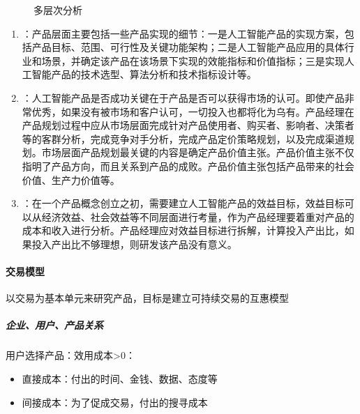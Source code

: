 \documentclass[letterpaper,10pt,english]{sphinxmanual}
\begin{document}
\begin{figure}[H]
\centering
\capstart

\noindent{}
\caption{多层次分析}\label{\detokenize{chapter_idea/business:id31}}\end{figure}
\begin{enumerate}
%
\item {} 
：产品层面主要包括一些产品实现的细节：一是人工智能产品的实现方案，包括产品目标、范围、可行性及关键功能架构；二是人工智能产品应用的具体行业和场景，并确定该产品在该场景下实现的效能指标和价值指标；三是实现人工智能产品的技术选型、算法分析和技术指标设计等。

\item {} 
：人工智能产品是否成功关键在于产品是否可以获得市场的认可。即使产品非常优秀，如果没有被市场和客户认可，一切投入也都将化为乌有。产品经理在产品规划过程中应从市场层面完成针对产品使用者、购买者、影响者、决策者等的客群分析，完成竞争对手分析，完成产品定价策略规划，以及完成渠道规划。市场层面产品规划最关键的内容是确定产品价值主张。产品价值主张不仅指明了产品方向，而且关系到产品的成败。产品价值主张包括产品带来的社会价值、生产力价值等。

\item {} 
：在一个产品概念创立之初，需要建立人工智能产品的效益目标，效益目标可以从经济效益、社会效益等不同层面进行考量，作为产品经理要着重对产品的成本和收入进行分析。产品经理应对效益目标进行拆解，计算投入产出比，如果投入产出比不够理想，则研发该产品没有意义。

\end{enumerate}


\paragraph{交易模型}
\label{\detokenize{chapter_idea/business:id16}}
以交易为基本单元来研究产品，目标是建立可持续交易的互惠模型


\subparagraph{企业、用户、产品关系}
\label{\detokenize{chapter_idea/business:id17}}
用户选择产品：效用\sphinxhyphen{}成本>0：
\begin{itemize}
\item {} 
直接成本：付出的时间、金钱、数据、态度等

\item {} 
间接成本：为了促成交易，付出的搜寻成本

\end{itemize}
\end{document}
